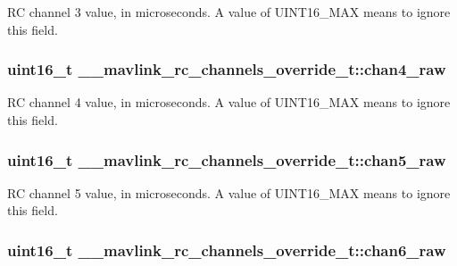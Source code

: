 R\+C channel 3 value, in microseconds. A value of U\+I\+N\+T16\+\_\+\+M\+A\+X means to ignore this field. 

\hypertarget{struct____mavlink__rc__channels__override__t_afc315c11bfffdd9aa051799c5d2d0fae}{
\subsubsection[{chan4\+\_\+raw}]{\setlength{\rightskip}{0pt plus 5cm}uint16\+\_\+t \+\_\+\+\_\+mavlink\+\_\+rc\+\_\+channels\+\_\+override\+\_\+t\+::chan4\+\_\+raw}}\label{struct____mavlink__rc__channels__override__t_afc315c11bfffdd9aa051799c5d2d0fae}


R\+C channel 4 value, in microseconds. A value of U\+I\+N\+T16\+\_\+\+M\+A\+X means to ignore this field. 

\hypertarget{struct____mavlink__rc__channels__override__t_a97c62336395d208d02837ca92085f3ac}{
\subsubsection[{chan5\+\_\+raw}]{\setlength{\rightskip}{0pt plus 5cm}uint16\+\_\+t \+\_\+\+\_\+mavlink\+\_\+rc\+\_\+channels\+\_\+override\+\_\+t\+::chan5\+\_\+raw}}\label{struct____mavlink__rc__channels__override__t_a97c62336395d208d02837ca92085f3ac}


R\+C channel 5 value, in microseconds. A value of U\+I\+N\+T16\+\_\+\+M\+A\+X means to ignore this field. 

\hypertarget{struct____mavlink__rc__channels__override__t_a8bef6b7819abe782e905da536c34b11d}{
\subsubsection[{chan6\+\_\+raw}]{\setlength{\rightskip}{0pt plus 5cm}uint16\+\_\+t \+\_\+\+\_\+mavlink\+\_\+rc\+\_\+channels\+\_\+override\+\_\+t\+::chan6\+\_\+raw}}\label{struct____mavlink__rc__channels__override__t_a8bef6b7819abe782e905da536c34b11d}


